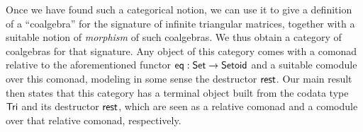 \documentclass{easychair}
\newcommand{\fat}[1]{\textbf{#1}}
\begin{document}
  Once we have found such a categorical notion, we can use 
  it to give a definition of a \enquote{coalgebra} for the signature of infinite triangular matrices, 
  together with a suitable notion of \emph{morphism} of such coalgebras.
   We thus obtain a category of coalgebras for that signature.
  Any object of this category comes with a comonad relative to the aforementioned functor $\mathsf{eq} : \mathsf{Set}\to\mathsf{Setoid}$
  and a suitable comodule over this comonad, modeling in some sense the destructor $\mathsf{rest}$.
  Our main result then states that this category 
  has a terminal object built from the codata type $\mathsf{Tri}$ and its destructor $\mathsf{rest}$,
  which are seen as a relative comonad and a comodule over that relative comonad, respectively.
% 
% 
% 
% 
% 
% 
% 
% 
\end{document}
